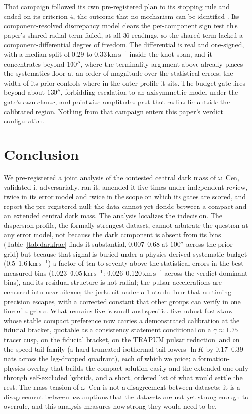 \documentclass[11pt]{article}
\newcommand{\ocen}{$\omega$~Cen}
\newcommand{\lnK}{\ensuremath{\ln K}}
\newcommand{\kms}{\ensuremath{\mathrm{km\,s^{-1}}}}
\begin{document}
That campaign followed its own pre-registered plan to its stopping rule and ended on its criterion 4, the outcome
that no mechanism can be identified \citep{OCS2026axi}. Its component-resolved discrepancy
model clears the per-component sign test this paper's shared radial term failed, at all 36
readings, so the shared term lacked a component-differential degree of freedom. The
differential is real and one-signed, with a median split of 0.29 to 0.33\,\kms{} inside the knot
span, and it concentrates beyond $100''$, where the terminality argument above already places the
systematics floor at an order of magnitude over the statistical errors; the width of its prior
controls where in the outer profile it sits. The budget gate fires beyond about $130''$, forbidding
escalation to an axisymmetric model under the gate's own clause, and pointwise amplitudes past that
radius lie outside the calibrated region. Nothing from that campaign enters this paper's verdict
configuration.

\section{Conclusion}
\label{sec:conclusion}

We pre-registered a joint analysis of the contested central dark mass of \ocen, validated it adversarially, ran it, amended it five times under independent review, twice in its error model and twice in the scope on which its gates are scored, and report the pre-registered null: the data cannot yet decide between a compact and an extended central dark mass. The analysis localizes the indecision. The dispersion profile, the formally strongest dataset, cannot arbitrate the question at any error model, not because the dark component is absent from its bins (Table~\ref{tab:darkfrac} finds it substantial, 0.007--0.68 at $100''$ across the prior grid) but because that signal is buried under a physics-derived systematic budget (0.5--1.6\,\kms) a factor of ten to seventy above the statistical errors in the best-measured bins (0.023--0.05\,\kms; 0.026--0.120\,\kms{} across the verdict-dominant bins), and its residual structure is not radial; the pulsar accelerations are censored into near-silence; the jerks sit under a 1-stable floor that no timing precision escapes, with a corrected constant that other groups can verify in one line of algebra. What remains live is small and specific: five robust fast stars whose stable compact preference now carries a demonstrated calibration at the fiducial bracket, quotable as a consistency statement conditional on a $\gamma \approx 1.75$ tracer cusp, on the fiducial bracket, on the TRAPUM pulsar reduction, and on the speed-tail family (a hard-truncated isothermal tail lowers $\lnK$ by 0.17--0.39 nats across the leg-dropped quadrant), each of which we price; a formation-physics overlay that builds the compact solution easily and the extended one only through self-excluded hybrids, and a short, ordered list of what would settle the rest. The mass tension of \ocen{} is not a disagreement between datasets; it is a disagreement between assumptions that the datasets are not yet strong enough to overrule, and this analysis measures how strong they would need to be.
\end{document}
